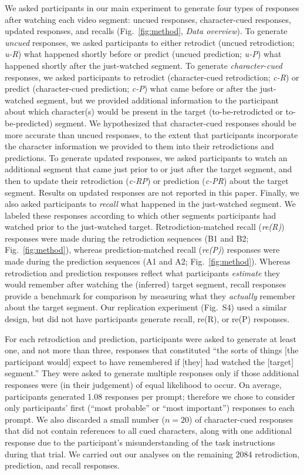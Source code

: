 \documentclass[10pt]{article}
\newcommand{\MethodsReplExp}{S4}
\begin{document}
We asked participants in our main experiment to generate four types of
responses after watching each video segment: uncued responses, character-cued
responses, updated responses, and recalls (Fig.~\ref{fig:method}, \textit{Data
overview}). To generate \textit{uncued} responses, we asked participants to
either retrodict (uncued retrodiction; \textit{u-R}) what happened shortly
before or predict (uncued prediction; \textit{u-P}) what happened shortly after
the just-watched segment. To generate \textit{character-cued} responses, we
asked participants to retrodict (character-cued retrodiction; \textit{c-R}) or
predict (character-cued prediction; \textit{c-P}) what came before or after the
just-watched segment, but we provided additional information to the participant
about which character(s) would be present in the target (to-be-retrodicted or
to-be-predicted) segment. We hypothesized that character-cued responses should
be more accurate than uncued responses, to the extent that participants
incorporate the character information we provided to them into their
retrodictions and predictions. To generate updated responses, we asked
participants to watch an additional segment that came just prior to or just
after the target segment, and then to update their retrodiction (\textit{c-RP})
or prediction (\textit{c-PR}) about the target segment. Results on updated
responses are not reported in this paper. Finally, we also asked participants
to \textit{recall} what happened in the just-watched segment. We labeled these
responses according to which other segments participants had watched prior to
the just-watched target. Retrodiction-matched recall (\textit{re(R)}) responses
were made during the retrodiction sequences (B1 and B2; Fig.~\ref{fig:method}),
whereas prediction-matched recall (\textit{re(P)}) responses were made during
the prediction sequences (A1 and A2; Fig.~\ref{fig:method}). Whereas
retrodiction and prediction responses reflect what participants
\textit{estimate} they would remember after watching the (inferred) target
segment, recall responses provide a benchmark for comparison by measuring what
they \textit{actually} remember about the target segment. Our replication
experiment (Fig.~\MethodsReplExp) used a similar design, but did not have
participants generate recall, re(R), or re(P) responses.

For each retrodiction and prediction, participants were asked to generate at
least one, and not more than three, responses that constituted ``the sorts of
things [the participant would] expect to have remembered if [they] had watched
the [target] segment.'' They were asked to generate multiple responses only if
those additional responses were (in their judgement) of equal likelihood to
occur. On average, participants generated 1.08 responses per prompt; therefore
we chose to consider only participants' first (``most probable'' or ``most
important'') responses to each prompt. We also discarded a small number ($n =
20$) of character-cued responses that did not contain references to all cued
characters, along with one additional response due to the participant's
misunderstanding of the task instructions during that trial. We carried out our
analyses on the remaining 2084 retrodiction, prediction, and recall responses.
\end{document}

